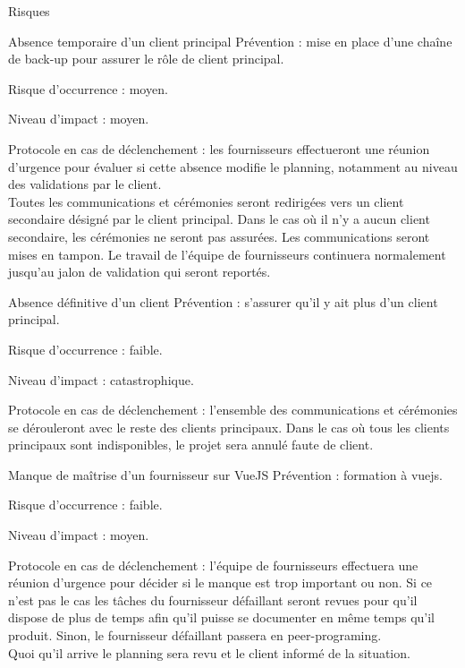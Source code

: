 \documentclass[]{article}
\begin{document}
\begin{section}{Risques}
        \begin{subsection}{Absence temporaire d’un client principal}
            Prévention : mise en place d’une chaîne de back-up pour assurer le rôle de client principal.

            Risque d’occurrence : moyen.

            Niveau d’impact : moyen.

            Protocole en cas de déclenchement : les fournisseurs effectueront une réunion d’urgence pour évaluer si cette 
            absence modifie le planning, notamment au niveau des validations par le client.\\
            Toutes les communications et cérémonies seront redirigées vers un client secondaire désigné par le
            client principal. Dans le cas où il n’y a aucun client secondaire, les cérémonies ne seront pas
            assurées. Les communications seront mises en tampon. Le travail de l’équipe de fournisseurs continuera
            normalement jusqu’au jalon de validation qui seront reportés.
        \end{subsection}

        \begin{subsection}{Absence définitive d’un client}
            Prévention : s’assurer qu’il y ait plus d’un client principal.

            Risque d’occurrence : faible.

            Niveau d’impact : catastrophique.

            Protocole en cas de déclenchement : l’ensemble des communications et cérémonies se dérouleront avec le reste des 
            clients principaux.
            Dans le cas où tous les clients principaux sont indisponibles, le projet sera annulé faute de client.
            
        \end{subsection}

        \begin{subsection}{Manque de maîtrise d’un fournisseur sur VueJS}
            Prévention : formation à vuejs.

            Risque d’occurrence : faible.

            Niveau d’impact : moyen.

            Protocole en cas de déclenchement : l’équipe de fournisseurs effectuera une réunion d’urgence pour décider si le 
            manque est trop important ou non. Si ce n’est pas le cas les tâches du fournisseur défaillant seront revues pour 
            qu’il dispose de plus de temps afin qu’il puisse se documenter en même temps qu’il produit. Sinon, le fournisseur 
            défaillant passera en peer-programing.\\
            Quoi qu’il arrive le planning sera revu et le client informé de la situation.
        \end{subsection}


\end{section}
\end{document}
